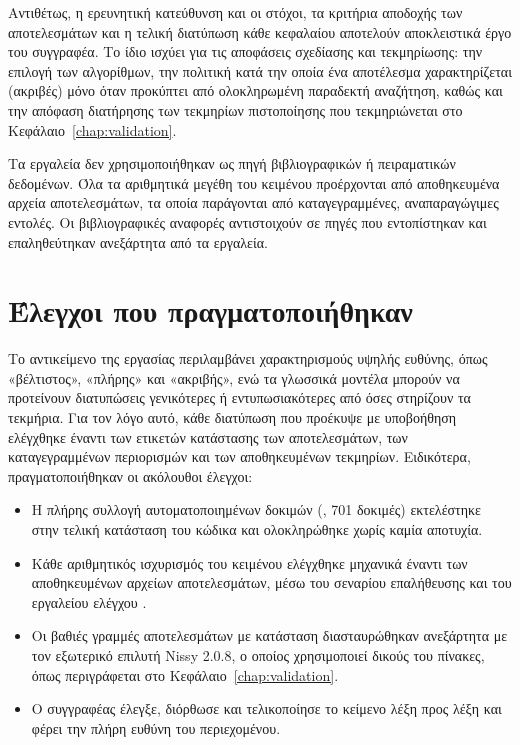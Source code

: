 Αντιθέτως, η ερευνητική κατεύθυνση και οι στόχοι, τα κριτήρια αποδοχής των αποτελεσμάτων και η τελική διατύπωση κάθε κεφαλαίου αποτελούν αποκλειστικά έργο του συγγραφέα. Το ίδιο ισχύει για τις αποφάσεις σχεδίασης και τεκμηρίωσης: την επιλογή των αλγορίθμων, την πολιτική κατά την οποία ένα αποτέλεσμα χαρακτηρίζεται  (ακριβές) μόνο όταν προκύπτει από ολοκληρωμένη παραδεκτή αναζήτηση, καθώς και την απόφαση διατήρησης των τεκμηρίων πιστοποίησης που τεκμηριώνεται στο Κεφάλαιο~\ref{chap:validation}.

Τα εργαλεία δεν χρησιμοποιήθηκαν ως πηγή βιβλιογραφικών ή πειραματικών δεδομένων. Όλα τα αριθμητικά μεγέθη του κειμένου προέρχονται από αποθηκευμένα αρχεία αποτελεσμάτων, τα οποία παράγονται από καταγεγραμμένες, αναπαραγώγιμες εντολές. Οι βιβλιογραφικές αναφορές αντιστοιχούν σε πηγές που εντοπίστηκαν και επαληθεύτηκαν ανεξάρτητα από τα εργαλεία.

\section{Έλεγχοι που πραγματοποιήθηκαν}
\label{sec:ai-verification}

Το αντικείμενο της εργασίας περιλαμβάνει χαρακτηρισμούς υψηλής ευθύνης, όπως «βέλτιστος», «πλήρης» και «ακριβής», ενώ τα γλωσσικά μοντέλα μπορούν να προτείνουν διατυπώσεις γενικότερες ή εντυπωσιακότερες από όσες στηρίζουν τα τεκμήρια. Για τον λόγο αυτό, κάθε διατύπωση που προέκυψε με υποβοήθηση ελέγχθηκε έναντι των ετικετών κατάστασης των αποτελεσμάτων, των καταγεγραμμένων περιορισμών και των αποθηκευμένων τεκμηρίων. Ειδικότερα, πραγματοποιήθηκαν οι ακόλουθοι έλεγχοι:
\begin{itemize}
  \item Η πλήρης συλλογή αυτοματοποιημένων δοκιμών (, 701 δοκιμές) εκτελέστηκε στην τελική κατάσταση του κώδικα και ολοκληρώθηκε χωρίς καμία αποτυχία.
  \item Κάθε αριθμητικός ισχυρισμός του κειμένου ελέγχθηκε μηχανικά έναντι των αποθηκευμένων αρχείων αποτελεσμάτων, μέσω του σεναρίου επαλήθευσης  και του εργαλείου ελέγχου .
  \item Οι βαθιές γραμμές αποτελεσμάτων με κατάσταση  διασταυρώθηκαν ανεξάρτητα με τον εξωτερικό επιλυτή Nissy 2.0.8, ο οποίος χρησιμοποιεί δικούς του πίνακες, όπως περιγράφεται στο Κεφάλαιο~\ref{chap:validation}.
  \item Ο συγγραφέας έλεγξε, διόρθωσε και τελικοποίησε το κείμενο λέξη προς λέξη και φέρει την πλήρη ευθύνη του περιεχομένου.
\end{itemize}

